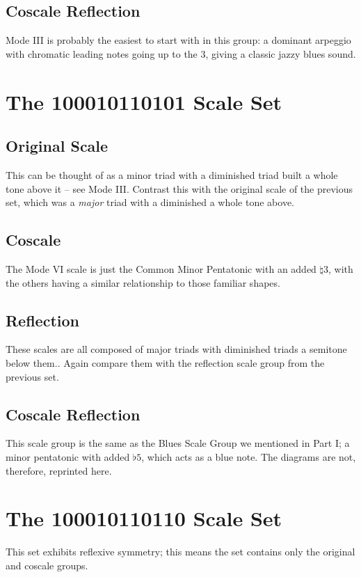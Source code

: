 \documentclass[english]{./gbook}
\begin{document}
\begin{large}
\subsection*{Coscale Reflection}
Mode III is probably the easiest to start with in this group: a dominant arpeggio with chromatic leading notes going up to the 3, giving a classic jazzy blues sound.



\section{The 100010110101 Scale Set}
\subsection*{Original Scale}
This can be thought of as a minor triad with a diminished triad built a whole tone above it -- see Mode III. Contrast this with the original scale of the previous set, which was a \emph{major} triad with a diminished a whole tone above.
\subsection*{Coscale}
The Mode VI scale is just the Common Minor Pentatonic with an added $\natural3$, with the others having a similar relationship to those familiar shapes.
\subsection*{Reflection}
These scales are all composed of major triads with diminished triads a semitone below them.. Again compare them with the reflection scale group from the previous set.
\subsection*{Coscale Reflection}
This scale group is the same as the Blues Scale Group we mentioned in Part I; a minor pentatonic with added $\flat5$, which acts as a blue note. The diagrams are not, therefore, reprinted here.

\section{The 100010110110 Scale Set}
This set exhibits reflexive symmetry; this means the set contains only the original and coscale groups.

\end{large}
\end{document}
